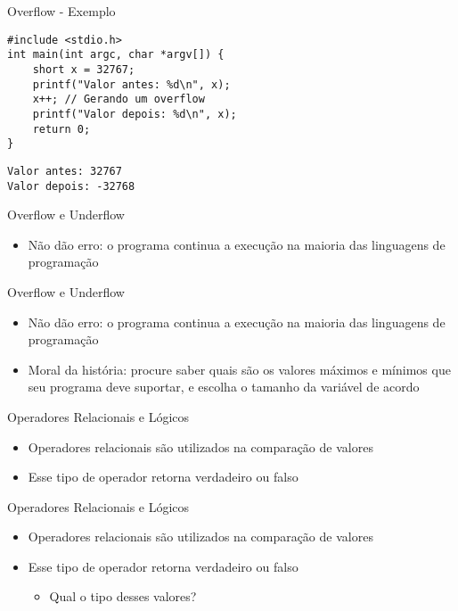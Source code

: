\documentclass[t, aspectratio=169]{beamer}
\begin{document}
\begin{frame}[label={sec:org052383e},fragile]{Overflow - Exemplo}
 \vspace{-0.5cm}
\begin{verbatim}
#include <stdio.h>
int main(int argc, char *argv[]) {
    short x = 32767;
    printf("Valor antes: %d\n", x);
    x++; // Gerando um overflow
    printf("Valor depois: %d\n", x);
    return 0;
}
\end{verbatim}

\begin{verbatim}
Valor antes: 32767
Valor depois: -32768
\end{verbatim}
\end{frame}

\begin{frame}[label={sec:org6bbc634}]{Overflow e Underflow}
\begin{itemize}
\item Não dão erro: o programa \alert{continua a execução} na
\alert{maioria} das linguagens de programação
\end{itemize}
\end{frame}

\begin{frame}[label={sec:orgeab63d1}]{Overflow e Underflow}
\begin{itemize}
\item Não dão erro: o programa \alert{continua a execução} na
\alert{maioria} das linguagens de programação

\item \alert{Moral da história:} procure saber quais são os valores máximos e mínimos que
seu programa deve suportar, e escolha o tamanho da variável de acordo
\end{itemize}
\end{frame}

\begin{frame}[label={sec:orgb286133}]{Operadores Relacionais e Lógicos}
\begin{itemize}
\item Operadores relacionais são utilizados na comparação de valores
\item Esse tipo de operador retorna \alert{verdadeiro} ou \alert{falso}
\end{itemize}
\end{frame}

\begin{frame}[label={sec:org692968d}]{Operadores Relacionais e Lógicos}
\begin{itemize}
\item Operadores relacionais são utilizados na comparação de valores
\item Esse tipo de operador retorna \alert{verdadeiro} ou \alert{falso}
\begin{itemize}
\item Qual o tipo desses valores?
\end{itemize}
\end{itemize}
\end{frame}
\end{document}
